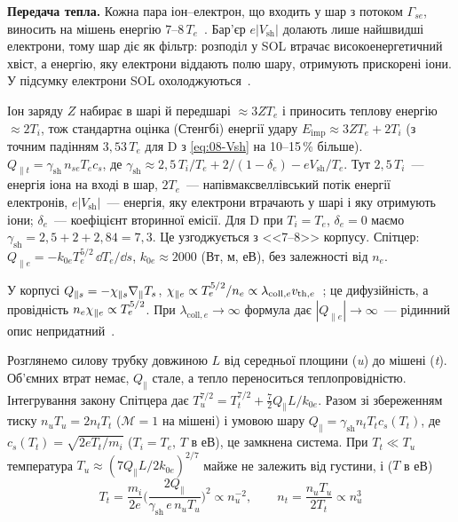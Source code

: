 \textbf{Передача тепла.} Кожна пара іон--електрон, що входить у шар з потоком $\Gamma_{se}$, виносить на мішень енергію $7$--$8\,T_e$~\cite[с.~25]{AhoMantila2011}. Бар'єр $e|V_{\mathrm{sh}}|$ долають лише найшвидші електрони, тому шар діє як фільтр: розподіл у SOL втрачає високоенергетичний хвіст, а енергію, яку електрони віддають полю шару, отримують прискорені іони. У підсумку електрони SOL охолоджуються~\cite[с.~25]{AhoMantila2011}.

\begin{outofcorpus}
Іон заряду $Z$ набирає в шарі й передшарі $\approx3ZT_e$ і приносить теплову енергію $\approx2T_i$, тож стандартна оцінка (Стенгбі) енергії удару $E_{\mathrm{imp}}\approx3ZT_e+2T_i$ (з точним падінням $3{,}53\,T_e$ для D з \eqref{eq:08-Vsh} на 10--15\,\% більше). $Q_{\parallel t}=\gamma_{\mathrm{sh}}\,n_{se}T_ec_s$, де $\gamma_{\mathrm{sh}}\approx2{,}5\,T_i/T_e+2/(1-\delta_e)-eV_{\mathrm{sh}}/T_e$. Тут $2{,}5\,T_i$~--- енергія іона на вході в шар, $2T_e$~--- напівмаксвеллівський потік енергії електронів, $e|V_{\mathrm{sh}}|$~--- енергія, яку електрони втрачають у шарі і яку отримують іони; $\delta_e$~--- коефіцієнт вторинної емісії. Для D при $T_i=T_e$, $\delta_e=0$ маємо $\gamma_{\mathrm{sh}}=2{,}5+2+2{,}84=7{,}3$. Це узгоджується з <<7--8>> корпусу. Спітцер: $Q_{\parallel e}=-k_{0e}T_e^{5/2}\,\dd T_e/\dd s$, $k_{0e}\approx2000$ (Вт, м, еВ), без залежності від $n_e$.
\end{outofcorpus}

У корпусі $Q_{\parallel s}=-\chi_{\parallel s}\nabla_\parallel T_s$, $\chi_{\parallel e}\propto T_e^{5/2}/n_e\propto\lambda_{\mathrm{coll},e}v_{\mathrm{th},e}$~\cite[с.~26, (2.3)--(2.4)]{AhoMantila2011}; це дифузійність, а провідність $n_e\chi_{\parallel e}\propto T_e^{5/2}$. При $\lambda_{\mathrm{coll},e}\to\infty$ формула дає $|Q_{\parallel e}|\to\infty$~--- рідинний опис непридатний~\cite[с.~27]{AhoMantila2011}.

\begin{outofcorpus}
Розглянемо силову трубку довжиною $L$ від середньої площини (\emph{u}) до мішені (\emph{t}). Об'ємних втрат немає, $Q_\parallel$ стале, а тепло переноситься теплопровідністю. Інтегрування закону Спітцера дає $T_u^{7/2}=T_t^{7/2}+\tfrac72Q_\parallel L/k_{0e}$. Разом зі збереженням тиску $n_uT_u=2n_tT_t$ ($\mathcal{M}=1$ на мішені) і умовою шару $Q_\parallel=\gamma_{\mathrm{sh}}n_tT_tc_s(T_t)$, де $c_s(T_t)=\sqrt{2eT_t/m_i}$ ($T_i=T_e$, $T$ в еВ), це замкнена система. При $T_t\ll T_u$ температура $T_u\approx(7Q_\parallel L/2k_{0e})^{2/7}$ майже не залежить від густини, і ($T$ в еВ)
\begin{equation}\label{eq:08-2pm}
  T_t=\frac{m_i}{2e}\Big(\frac{2Q_\parallel}{\gamma_{\mathrm{sh}}\,e\,n_uT_u}\Big)^2\propto n_u^{-2},\qquad n_t=\frac{n_uT_u}{2T_t}\propto n_u^{3}
\end{equation}
\end{outofcorpus}

